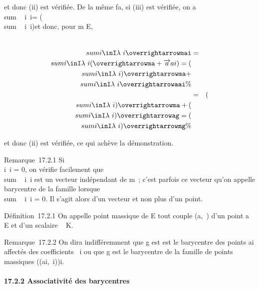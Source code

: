 et donc (ii) est vérifiée. De la même fa\ccon, si
(iii) est vérifiée, on a
\\sum ~
i\inI\lambda~i\overrightarrowaai =
(\\sum ~
i\inI\lambda~i)\overrightarrowag et donc,
pour m \in E,

\begin{align*} \\sum
i\inI\lambda~i\overrightarrowmai&
=& \\sum
i\inI\lambda~i(\overrightarrowma
+\overrightarrow aai) =
(\\sum
i\inI\lambda~i)\overrightarrowma +
\\sum
i\inI\lambda~i\overrightarrowaai\%&
\\ & =& (\\sum
i\inI\lambda~i)\overrightarrowma +
(\\sum
i\inI\lambda~i)\overrightarrowag =
(\\sum
i\inI\lambda~i)\overrightarrowmg \%&
\\ \end{align*}

et donc (ii) est vérifiée, ce qui achève la démonstration.

Remarque~17.2.1 Si \\\sum
 i\inI\lambda~i = 0, on vérifie facilement que
\\sum ~
i\inI\lambda~i\overrightarrowmai
est un vecteur \vecu indépendant de m~; c'est parfois
ce vecteur qu'on appelle barycentre de la famille lorsque
\\sum ~
i\inI\lambda~i = 0. Il s'agit alors d'un vecteur et non plus
d'un point.

Définition~17.2.1 On appelle point massique de E tout couple (a,\lambda~) d'un
point a \in E et d'un scalaire \lambda~ \in K.

Remarque~17.2.2 On dira indifféremment que g est est le barycentre des
points ai affectés des coefficients \lambda~i ou que g est
le barycentre de la famille de points massiques \left
((ai,\lambda~i)\right )i\inI.

\paragraph{17.2.2 Associativité des barycentres}

